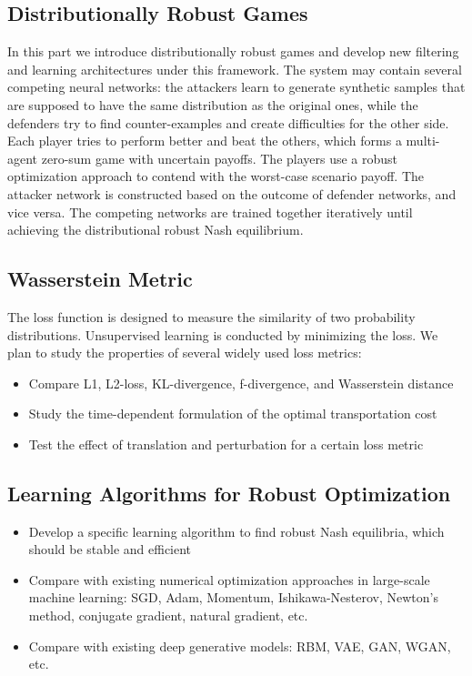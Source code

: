 \documentclass{article}
\begin{document}
\subsection{Distributionally Robust Games}
In this part we introduce distributionally robust games and develop new filtering and learning architectures under this framework. The system may contain several competing neural networks: the attackers learn to generate synthetic samples that are supposed to have the same distribution as the original ones, while the defenders try to find counter-examples and create difficulties for the other side. Each player tries to perform better and beat the others, which forms a multi-agent zero-sum game with uncertain payoffs. The players use a robust optimization approach to contend with the worst-case scenario payoff. The attacker network is constructed based on the outcome of defender networks, and vice versa. The competing networks are trained together iteratively until achieving the distributional robust Nash equilibrium.

\subsection{Wasserstein Metric}
The loss function is designed to measure the similarity of two probability distributions. Unsupervised learning is conducted by minimizing the loss. We plan to study the properties of several widely used loss metrics:
\begin{itemize}
\item Compare L1, L2-loss, KL-divergence, f-divergence, and Wasserstein distance
\item Study the time-dependent formulation of the optimal transportation cost
\item Test the effect of translation and perturbation for a certain loss metric
\end{itemize}

\subsection{Learning Algorithms for Robust Optimization}
\begin{itemize}
\item Develop a specific learning algorithm to find robust Nash equilibria, which should be stable and efficient
\item Compare with existing numerical optimization approaches in large-scale machine learning: SGD, Adam, Momentum, Ishikawa-Nesterov, Newton's method, conjugate gradient, natural gradient, etc.
\item Compare with existing deep generative models: RBM, VAE, GAN, WGAN, etc.
\end{itemize}
\end{document}
